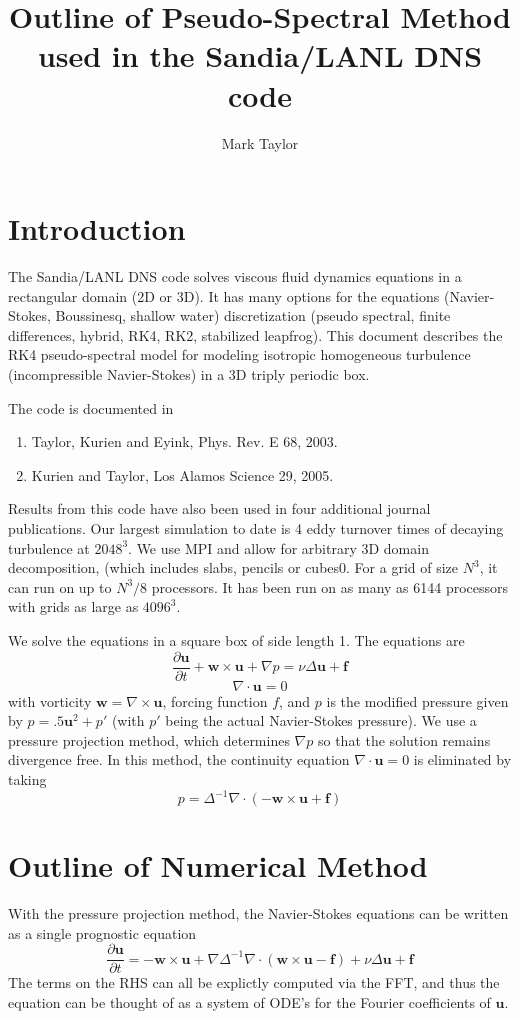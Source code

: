\documentclass[12pt]{article}
\title{Outline of Pseudo-Spectral Method used in the Sandia/LANL DNS code}
\author{Mark Taylor}
\newcommand{\uv}{\mathbf u}
\newcommand{\vor}{\mathbf w}
\newcommand{\f}{\mathbf f}
\newcommand{\grad}{\nabla}
\newcommand{\curl}{\grad \times}
\renewcommand{\div}{\grad \cdot}
\begin{document}
\maketitle
\tableofcontents

\section{Introduction}
The Sandia/LANL DNS code solves viscous fluid dynamics equations in a
rectangular domain (2D or 3D).  It has many options for the equations
(Navier-Stokes, Boussinesq, shallow water) discretization (pseudo spectral, 
finite differences, hybrid, RK4, RK2, stabilized leapfrog).  This document
describes the RK4 pseudo-spectral model for modeling isotropic homogeneous
turbulence (incompressible Navier-Stokes) in a 3D triply periodic box.

The code is documented in 
\begin{enumerate}
\item Taylor, Kurien and Eyink, Phys. Rev. E 68, 2003. 
\item Kurien and Taylor, Los Alamos Science 29, 2005. 
\end{enumerate}
Results from this code have also been used in four additional journal
publications.  Our largest simulation to date is 4 eddy turnover
times of decaying turbulence at $2048^3$.  We use MPI and allow
for arbitrary 3D domain decomposition, (which includes slabs,
pencils or cubes0.  For a grid of size $N^3$, it
can run on up to $N^3/8$ processors.  It has 
been run on as many as 6144 processors with grids as large
as $4096^3$.

We solve the equations in a square box of side length 1.
The equations are
\[
\frac{ \partial  \uv }{\partial t}  + \vor  \times \uv + 
\grad p   = \nu \Delta \uv + \f
\]
\[
\div \uv = 0
\]
with vorticity $\vor = \curl \uv$, forcing function $f$, and $p$ is the modified pressure
given by $p = .5 \uv^2 + p'$ (with $p'$ being the actual Navier-Stokes pressure).
We use a pressure projection method, which determines
$\grad p$ so that the solution remains
divergence free.  In this method, the continuity equation $\div \uv = 0$
is eliminated by taking
\[
 p =  \Delta^{-1} \div \left( -\vor \times \uv  + \f \right)
\]




\section{Outline of Numerical Method}
With the pressure projection method, the Navier-Stokes equations
can be written as a single prognostic equation
\[
\frac{ \partial  \uv }{\partial t} = 
  - \vor  \times \uv + 
\grad \Delta^{-1} \div \left( \vor \times \uv  -\f \right) +  \nu \Delta \uv + \f
\]
The terms on the RHS can all be explictly computed via the FFT, and
thus the equation can be thought of as a system of ODE's for the
Fourier coefficients of $\uv$.  
\end{document}
